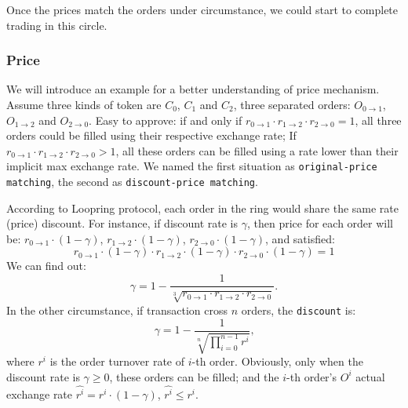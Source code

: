 \documentclass[UTF8,nofonts]{article}
\begin{document}
Once the prices match the orders under circumstance,  we could start to complete trading in this circle.

\subsubsection{Price\label{sec: matchprice}}
We will introduce an example for a better understanding of price mechanism. Assume three kinds of token are $C_{0}$, $C_{1}$ and $C_{2}$, three separated orders: $O_{0\rightarrow 1}$, $O_{1 \rightarrow 2}$ and $O_{2 \rightarrow 0}$. Easy to approve: if and only if $r_{0 \rightarrow 1} \cdot r_{1 \rightarrow 2}\cdot r_{2 \rightarrow 0} = 1$,  all three orders could be filled using their respective exchange rate; If $r_{0 \rightarrow 1} \cdot r_{1 \rightarrow 2}\cdot r_{2 \rightarrow 0} > 1$, all these orders can be filled using a rate lower than their implicit max exchange rate. We named the first situation as \texttt{original-price matching}, the second as \texttt{discount-price matching}.

According to Loopring protocol, each order in the ring would share the same rate (price) discount. For instance, if discount rate is $\gamma$, then price for each order will be:
$r_{0\rightarrow 1} \cdot (1-\gamma)$, $r_{1\rightarrow 2} \cdot (1-\gamma)$, $r_{2 \rightarrow 0} \cdot (1-\gamma)$, and satisfied: 
\begin{equation}
r_{0\rightarrow 1} \cdot (1-\gamma)\cdot r_{1\rightarrow 2} \cdot (1-\gamma) \cdot r_{2 \rightarrow 0} \cdot (1-\gamma) = 1
\end{equation}
We can find out: 
\begin{equation*}
\gamma = 1- \frac{1}{\sqrt[3]{r_{0\rightarrow 1} \cdot r_{1\rightarrow 2} \cdot r_{2\rightarrow 0}}}\text{.}
\end{equation*}
In the other circumstance, if transaction cross $n$ orders, the \texttt{discount} is: 
\begin{equation*}
\gamma = 1- \frac{1}{\sqrt[n]{\prod_{i=0}^{n-1} r^i}} \text{,}
\end{equation*}
where $r^i$ is the order turnover rate of $i$-th order. Obviously, only when the discount rate is $\gamma \ge 0$, these orders can be filled; and the $i$-th order's $O^i$ actual exchange rate $\hat{r^i} = r^i \cdot (1-\gamma)$, $\hat{r^i}\le r^i$.

\end{document}
